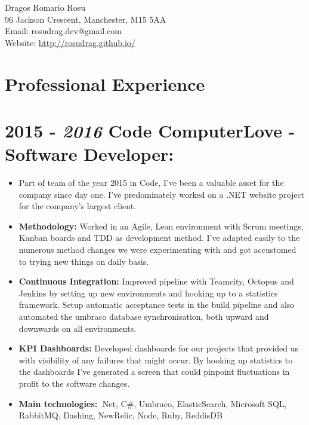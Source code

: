 \documentclass[12pt,a4paper]{res}
\begin{document}
\thispagestyle{empty}
  \begin{center}
  \Large{Dragos Romario Rosu  \\ [12pt]}
  \normalsize 96 Jackson Crescent, Manchester, M15 5AA\\
  Email: rosudrag.dev@gmail.com\\
  Website: \url{http://rosudrag.github.io/}
  \end{center}
  
\begin{resume}
\vspace{-10mm}
\section{\large\bf Professional Experience}

\section{\bf 2015 - \textit{2016} \hspace{0.3mm} Code ComputerLove - Software Developer:}
\vspace{5mm}    
	\begin{itemize}
	\item[] Part of team of the year 2015 in Code, I've been a valuable asset for the company since day one. I've predominately worked on a .NET website project for the company's largest client.
	\item \textbf{Methodology:} Worked in an Agile, Lean environment with Scrum meetings, Kanban boards and TDD as development method. I've adapted easily to the numerous method changes we were experimenting with and got accustomed to trying new things on daily basis.
	\item \textbf{Continuous Integration:} Improved pipeline with Teamcity, Octopus and Jenkins by setting up new environments and hooking up to a statistics framework. Setup automatic acceptance tests in the build pipeline and also automated the umbraco database synchronisation, both upward and downwards on all environments.
	\item \textbf{KPI Dashboards:} Developed dashboards for our projects that provided us with visibility of any failures that might occur. By hooking up statistics to the dashboards I've generated a screen that could pinpoint fluctuations in profit to the software changes.
	\item \textbf{Main technologies:} .Net, C\#, Umbraco, ElasticSearch, Microsoft SQL, RabbitMQ, Dashing, NewRelic, Node, Ruby, ReddisDB
	\end{itemize}
	

\end{resume}
\end{document}
